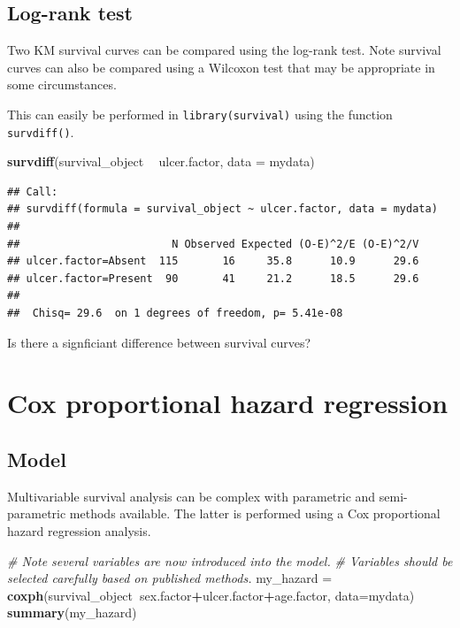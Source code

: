 \documentclass[]{book}
\makeatletter
\newenvironment{Shaded}{\begin{snugshade}}{\end{snugshade}}
\newcommand{\KeywordTok}[1]{\textcolor[rgb]{0.13,0.29,0.53}{\textbf{#1}}}
\newcommand{\DataTypeTok}[1]{\textcolor[rgb]{0.13,0.29,0.53}{#1}}
\newcommand{\StringTok}[1]{\textcolor[rgb]{0.31,0.60,0.02}{#1}}
\newcommand{\CommentTok}[1]{\textcolor[rgb]{0.56,0.35,0.01}{\textit{#1}}}
\newcommand{\OperatorTok}[1]{\textcolor[rgb]{0.81,0.36,0.00}{\textbf{#1}}}
\newcommand{\NormalTok}[1]{#1}
\newenvironment{kframe}{%
\medskip{}
\setlength{\fboxsep}{.8em}
 \def\at@end@of@kframe{}%
 \ifinner\ifhmode%
  \def\at@end@of@kframe{\end{minipage}}%
  \begin{minipage}{\columnwidth}%
 \fi\fi%
 \def\FrameCommand##1{\hskip\@totalleftmargin \hskip-\fboxsep
 \colorbox{shadecolor}{##1}\hskip-\fboxsep
     \hskip-\linewidth \hskip-\@totalleftmargin \hskip\columnwidth}%
 \MakeFramed {\advance\hsize-\width
   \@totalleftmargin\z@ \linewidth\hsize
   \@setminipage}}%
 {\par\unskip\endMakeFramed%
 \at@end@of@kframe}
\renewenvironment{Shaded}{\begin{kframe}}{\end{kframe}}
\makeatother
\begin{document}
\subsection{Log-rank test}\label{log-rank-test}

Two KM survival curves can be compared using the log-rank test. Note
survival curves can also be compared using a Wilcoxon test that may be
appropriate in some circumstances.

This can easily be performed in \texttt{library(survival)} using the
function \texttt{survdiff()}.

\begin{Shaded}
\begin{Highlighting}[]
\KeywordTok{survdiff}\NormalTok{(survival_object }\OperatorTok{~}\StringTok{ }\NormalTok{ulcer.factor, }\DataTypeTok{data =}\NormalTok{ mydata)}
\end{Highlighting}
\end{Shaded}

\begin{verbatim}
## Call:
## survdiff(formula = survival_object ~ ulcer.factor, data = mydata)
## 
##                        N Observed Expected (O-E)^2/E (O-E)^2/V
## ulcer.factor=Absent  115       16     35.8      10.9      29.6
## ulcer.factor=Present  90       41     21.2      18.5      29.6
## 
##  Chisq= 29.6  on 1 degrees of freedom, p= 5.41e-08
\end{verbatim}

Is there a signficiant difference between survival curves?

\section{Cox proportional hazard
regression}\label{cox-proportional-hazard-regression}

\subsection{Model}\label{model-1}

Multivariable survival analysis can be complex with parametric and
semi-parametric methods available. The latter is performed using a Cox
proportional hazard regression analysis.

\begin{Shaded}
\begin{Highlighting}[]
\CommentTok{# Note several variables are now introduced into the model. }
\CommentTok{# Variables should be selected carefully based on published methods.  }
\NormalTok{my_hazard =}\StringTok{ }\KeywordTok{coxph}\NormalTok{(survival_object}\OperatorTok{~}\NormalTok{sex.factor}\OperatorTok{+}\NormalTok{ulcer.factor}\OperatorTok{+}\NormalTok{age.factor, }\DataTypeTok{data=}\NormalTok{mydata)}
\KeywordTok{summary}\NormalTok{(my_hazard)}
\end{Highlighting}
\end{Shaded}
\end{document}
